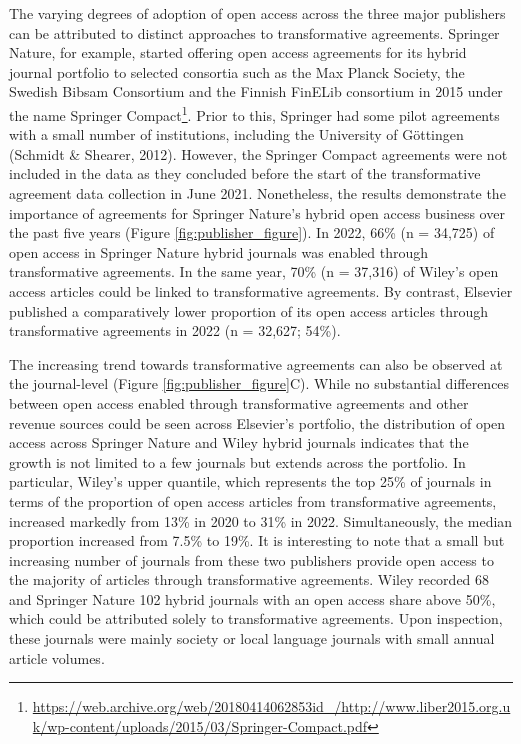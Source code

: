 \documentclass[a4paper,man,floatsintext,longtable,noextraspace,12pt]{apa6}
\begin{document}
The varying degrees of adoption of open access across the three major
publishers can be attributed to distinct approaches to transformative
agreements. Springer Nature, for example, started offering open access
agreements for its hybrid journal portfolio to selected consortia such
as the Max Planck Society, the Swedish Bibsam Consortium and the Finnish
FinELib consortium in 2015 under the name Springer Compact\footnote{\url{https://web.archive.org/web/20180414062853id_/http://www.liber2015.org.uk/wp-content/uploads/2015/03/Springer-Compact.pdf}}.
Prior to this, Springer had some pilot agreements with a small number of
institutions, including the University of Göttingen (Schmidt \& Shearer,
2012). However, the Springer Compact agreements were not included in the
data as they concluded before the start of the transformative agreement
data collection in June 2021. Nonetheless, the results demonstrate the
importance of agreements for Springer Nature's hybrid open access
business over the past five years (Figure \ref{fig:publisher_figure}).
In 2022, 66\% (n = 34,725) of open access in Springer Nature hybrid
journals was enabled through transformative agreements. In the same
year, 70\% (n = 37,316) of Wiley's open access articles could be linked
to transformative agreements. By contrast, Elsevier published a
comparatively lower proportion of its open access articles through
transformative agreements in 2022 (n = 32,627; 54\%).

The increasing trend towards transformative agreements can also be
observed at the journal-level (Figure \ref{fig:publisher_figure}C).
While no substantial differences between open access enabled through
transformative agreements and other revenue sources could be seen across
Elsevier's portfolio, the distribution of open access across Springer
Nature and Wiley hybrid journals indicates that the growth is not
limited to a few journals but extends across the portfolio. In
particular, Wiley's upper quantile, which represents the top 25\% of
journals in terms of the proportion of open access articles from
transformative agreements, increased markedly from 13\% in 2020 to 31\%
in 2022. Simultaneously, the median proportion increased from 7.5\% to
19\%. It is interesting to note that a small but increasing number of
journals from these two publishers provide open access to the majority
of articles through transformative agreements. Wiley recorded 68 and
Springer Nature 102 hybrid journals with an open access share above
50\%, which could be attributed solely to transformative agreements.
Upon inspection, these journals were mainly society or local language
journals with small annual article volumes.
\end{document}
